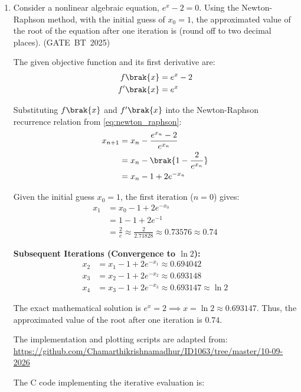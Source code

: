 \begin{enumerate}[label=\thesubsection.\arabic*, ref=\thesubsection.\theenumi]
\item Consider a nonlinear algebraic equation, $e^x - 2 = 0$. Using the Newton-Raphson method, with the initial guess of $x_0 = 1$, the approximated value of the root of the equation after one iteration is \underline{\hspace{1.5cm}} (round off to two decimal places).
\hfill (GATE~BT~2025)

\solution
The given objective function and its first derivative are:
\begin{align}
f\brak{x} &= e^x - 2 \\
f'\brak{x} &= e^x
\end{align}

Substituting $f\brak{x}$ and $f'\brak{x}$ into the Newton-Raphson recurrence relation from \eqref{eq:newton_raphson}:
\begin{align}
x_{n+1} &= x_n - \frac{e^{x_n} - 2}{e^{x_n}} \\
&= x_n - \brak{1 - \frac{2}{e^{x_n}}} \\
&= x_n - 1 + 2e^{-x_n}
\end{align}

Given the initial guess $x_0 = 1$, the first iteration ($n = 0$) gives:
\begin{align}
x_1 &= x_0 - 1 + 2e^{-x_0} \\
&= 1 - 1 + 2e^{-1} \\
&= \frac{2}{e} \approx \frac{2}{2.71828} \approx 0.73576 \approx 0.74
\end{align}

\noindent\textbf{Subsequent Iterations (Convergence to $\ln 2$):}
\begin{align}
x_2 &= x_1 - 1 + 2e^{-x_1} \approx 0.694042 \\
x_3 &= x_2 - 1 + 2e^{-x_2} \approx 0.693148 \\
x_4 &= x_3 - 1 + 2e^{-x_3} \approx 0.693147 \approx \ln 2
\end{align}

The exact mathematical solution is $e^x = 2 \implies x = \ln 2 \approx 0.693147$. Thus, the approximated value of the root after one iteration is $\mathbf{0.74}$.

The implementation and plotting scripts are adapted from: \\
{\hypersetup{urlcolor=blue}\url{https://github.com/Chamarthikrishnamadhur/ID1063/tree/master/10-09-2026}}

The C code implementing the iterative evaluation is:



\end{enumerate}
